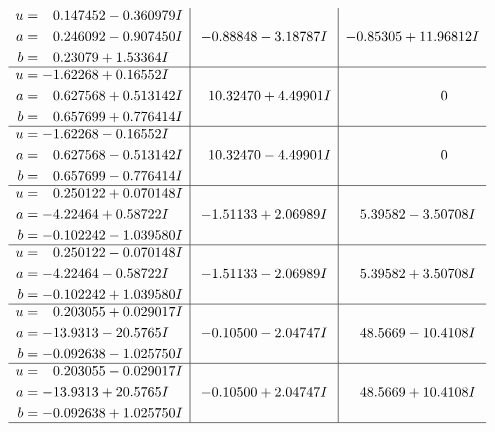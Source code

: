 \documentclass[1p]{elsarticle_modified}
\theoremstyle{definition}
\begin{document}
$$\begin{array}{c|c|c}
\begin{aligned}
u &= \phantom{-}0.147452 - 0.360979 I \\
a &= \phantom{-}0.246092 - 0.907450 I \\
b &= \phantom{-}0.23079 + 1.53364 I\end{aligned}
 & -0.88848 - 3.18787 I & -0.85305 + 11.96812 I \\ \hline\begin{aligned}
u &= -1.62268 + 0.16552 I \\
a &= \phantom{-}0.627568 + 0.513142 I \\
b &= \phantom{-}0.657699 + 0.776414 I\end{aligned}
 & \phantom{-}10.32470 + 4.49901 I & \phantom{-0.000000 } 0 \\ \hline\begin{aligned}
u &= -1.62268 - 0.16552 I \\
a &= \phantom{-}0.627568 - 0.513142 I \\
b &= \phantom{-}0.657699 - 0.776414 I\end{aligned}
 & \phantom{-}10.32470 - 4.49901 I & \phantom{-0.000000 } 0 \\ \hline\begin{aligned}
u &= \phantom{-}0.250122 + 0.070148 I \\
a &= -4.22464 + 0.58722 I \\
b &= -0.102242 - 1.039580 I\end{aligned}
 & -1.51133 + 2.06989 I & \phantom{-}5.39582 - 3.50708 I \\ \hline\begin{aligned}
u &= \phantom{-}0.250122 - 0.070148 I \\
a &= -4.22464 - 0.58722 I \\
b &= -0.102242 + 1.039580 I\end{aligned}
 & -1.51133 - 2.06989 I & \phantom{-}5.39582 + 3.50708 I \\ \hline\begin{aligned}
u &= \phantom{-}0.203055 + 0.029017 I \\
a &= -13.9313 - 20.5765 I \\
b &= -0.092638 - 1.025750 I\end{aligned}
 & -0.10500 - 2.04747 I & \phantom{-}48.5669 - 10.4108 I \\ \hline\begin{aligned}
u &= \phantom{-}0.203055 - 0.029017 I \\
a &= -13.9313 + 20.5765 I \\
b &= -0.092638 + 1.025750 I\end{aligned}
 & -0.10500 + 2.04747 I & \phantom{-}48.5669 + 10.4108 I\\
 \hline 
 \end{array}$$\newpage\newpage\renewcommand{\arraystretch}{1}
\end{document}
